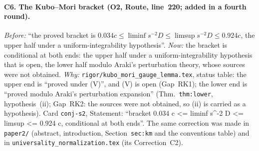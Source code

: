 \documentclass[11pt]{article}
\theoremstyle{accent}
\theoremstyle{definition}
\begin{document}
{\paragraph{C6. The Kubo--Mori bracket (O2, Route, line~220; added in a fourth round).}
\emph{Before:} ``the proved bracket is \(0.034c\le\liminf s^{-2}D\le\limsup s^{-2}D\le0.924c\), the upper half
under a uniform-integrability hypothesis''.
\emph{Now:} the bracket is conditional at both ends: the upper half under a uniform-integrability
hypothesis that is open, the lower half modulo Araki's perturbation theory, whose sources were not obtained.
\emph{Why:} \texttt{rigor/kubo\_mori\_gauge\_lemma.tex}, status table: the upper end is ``proved under (V)'', and (V) is open (Gap~RK1); the lower end is ``proved modulo Araki's perturbation expansion'' (Thm.~\texttt{thm:lower}, hypothesis~(ii); Gap~RK2: the sources were not obtained, so (ii) is carried as a hypothesis).  Card \texttt{conj-s2}, Statement: ``bracket 0.034 c <= liminf s\^{}-2 D <= limsup <= 0.924 c, conditional at both ends''.  The same correction was made in \texttt{paper2/} (abstract, introduction,
Section~\texttt{sec:km} and the conventions table) and in \texttt{universality\_normalization.tex}
(its Correction~C2).
}
\end{document}
